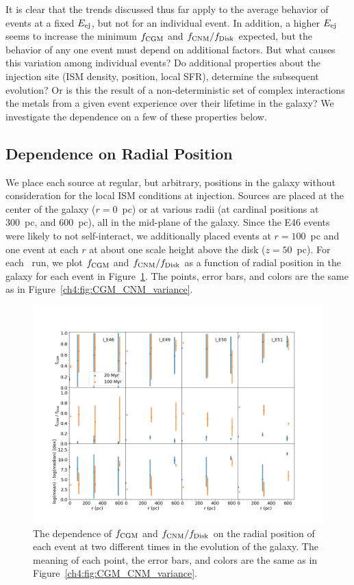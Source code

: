 It is clear that the trends discussed thus far apply to the average behavior of events at a fixed $E_{\rm ej}$, but not for an individual event. In addition, a higher $E_{\rm ej}$ seems to increase the minimum $f_{\rm CGM}$ and $f_{\rm CNM} / f_{\rm Disk}$ expected, but the behavior of any one event must depend on additional factors. But what causes this variation among individual events? Do additional properties about the injection site (ISM density, position, local SFR), determine the subsequent evolution? Or is this the result of a non-deterministic set of complex interactions the metals from a given event experience over their lifetime in the galaxy? We investigate the dependence on a few of these properties below.

\subsection{Dependence on Radial Position}
\label{ch4:sec:radial position}
We place each source at regular, but arbitrary, positions in the galaxy without consideration for the local ISM conditions at injection. Sources are placed at the center of the galaxy ($r = 0$~pc) or at various radii (at cardinal positions at 300~pc, and 600~pc), all in the mid-plane of the galaxy. Since the E46 events were likely to not self-interact, we additionally placed events at $r = 100$~pc and one event at each $r$ at about one scale height above the disk ($z = 50$~pc). For each \runonenu~run, we plot $f_{\rm CGM}$ and $f_{\rm CNM} / f_{\rm Disk}$ as a function of radial position in the galaxy for each event in Figure~\ref{ch4:fig:radial position}. The points, error bars, and colors are the same as in Figure~\ref{ch4:fig:CGM_CNM_variance}.

 \begin{figure}
   \centering
   \includegraphics[angle=90,width=0.9\linewidth]{figures/ch4/II_radial_dependence}
   \caption{The dependence of $f_{\rm CGM}$ and $f_{\rm CNM} / f_{\rm Disk}$ on the radial position of each event at two different times in the evolution of the galaxy. The meaning of each point, the error bars, and colors are the same as in Figure~\ref{ch4:fig:CGM_CNM_variance}.}
   \label{ch4:fig:radial position}
 \end{figure}

